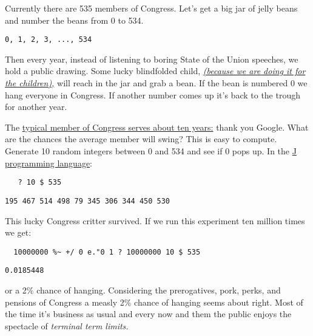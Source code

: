 Currently there are 535 members of Congress. Let's get a big jar of
jelly beans and number the beans from 0 to 534.

\begin{verbatim}
0, 1, 2, 3, ..., 534
\end{verbatim}
Then every year, instead of listening to boring State of the Union
speeches, we hold a public drawing. Some lucky blindfolded child,
\emph{\href{http://captaincapitalism.blogspot.com/2009/12/please-stop-it-with-think-of-children.html}{(because
we are doing it for the children),}} will reach in the jar and grab a
bean. If the bean is numbered 0 we hang everyone in Congress. If another
number comes up it's back to the trough for another year.

The
\href{http://docs.google.com/viewer?a=v\&q=cache:P925W\_GMcNwJ:www.senate.gov/reference/resources/pdf/RS22007.pdf+congress+term+average\&hl=en\&gl=us\&pid=bl\&srcid=ADGEESi6G0dwq2fAncmpqw--WUWGaARLZ2-1yYqExeYvjf\_P7ByhvGUlDSKP\_3sbbXFiMfjp6drsojRfNfILIRBkIl1L7ghstd6yoUirPblHoXFco1Q7gFEbNMKtQa55-cEjaT-MkuDi\&sig=AHIEtbSGxJ45QmhPawXiT2TOiB7zpp5u2A}{typical
member of Congress serves about ten years:} thank you Google. What are
the chances the average member will swing? This is easy to compute.
Generate 10 random integers between 0 and 534 and see if 0 pops up. In
the \href{http://www.jsoftware.com/}{J programming language}:

\begin{verbatim}
   ? 10 $ 535
\end{verbatim}
\begin{verbatim}
195 467 514 498 79 345 306 344 450 530
\end{verbatim}
This lucky Congress critter survived. If we run this experiment ten
million times we get:

\begin{verbatim}
  10000000 %~ +/ 0 e."0 1 ? 10000000 10 $ 535
\end{verbatim}
\begin{verbatim}
0.0185448
\end{verbatim}
or a 2\% chance of hanging. Considering the prerogatives, pork, perks,
and pensions of Congress a measly 2\% chance of hanging seems about
right. Most of the time it's business as usual and every now and them
the public enjoys the spectacle of \emph{terminal term limits.}



%